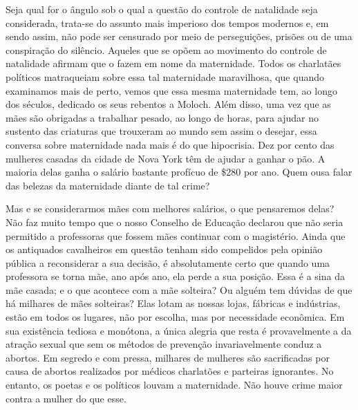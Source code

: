 Seja qual for o ângulo sob o qual a questão do controle de natalidade seja
considerada, trata-se do assunto mais imperioso dos tempos modernos e, em sendo
assim, não pode ser censurado por meio de perseguições, prisões ou de uma
conspiração do silêncio. Aqueles que se opõem ao movimento do controle
de natalidade afirmam que o fazem em nome da maternidade. Todos os
charlatães políticos matraqueiam sobre essa tal maternidade maravilhosa,
que quando examinamos mais de perto, vemos que essa mesma maternidade
tem, ao longo dos séculos, dedicado os seus rebentos a Moloch. Além
disso, uma vez que as mães são obrigadas a trabalhar pesado, ao longo de
horas, para ajudar no sustento das criaturas que trouxeram ao mundo sem
assim o desejar, essa conversa sobre maternidade nada mais é do que
hipocrisia. Dez por cento das mulheres casadas da cidade de Nova York
têm de ajudar a ganhar o pão. A maioria delas ganha o salário bastante
profícuo de \$280 por ano. Quem ousa falar das belezas da maternidade
diante de tal crime?

Mas e se considerarmos mães com melhores salários, o que pensaremos
delas? Não faz muito tempo que o nosso Conselho de Educação declarou que
não seria permitido a professoras que fossem mães continuar com o
magistério. Ainda que os antiquados cavalheiros em questão tenham sido
compelidos pela opinião pública a reconsiderar a sua decisão, é
absolutamente certo que quando uma professora se torna mãe, ano após
ano, ela perde a sua posição. Essa é a sina da mãe casada; e o que
acontece com a mãe solteira? Ou alguém tem dúvidas de que há milhares de
mães solteiras? Elas lotam as nossas lojas, fábricas e indústrias, estão
em todos os lugares, não por escolha, mas por necessidade econômica. Em
sua existência tediosa e monótona, a única alegria que resta é
provavelmente a da atração sexual que sem os métodos de prevenção
invariavelmente conduz a abortos. Em segredo e com pressa, milhares de\label{aborto}
mulheres são sacrificadas por causa de abortos realizados por médicos
charlatões e parteiras ignorantes. No entanto, os poetas e os políticos
louvam a maternidade. Não houve crime maior contra a mulher do que esse.

